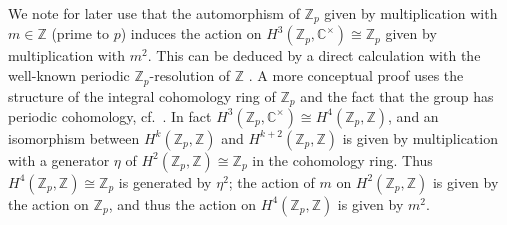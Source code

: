 \documentclass[12pt]{amsart}
\theoremstyle{remark}
\theoremstyle{definition}
\numberwithin{equation}{section}
\newcommand\CC{\mathbb C}
\newcommand\ZZ{\mathbb Z}
\begin{document}
We note for later use that the automorphism of $\ZZ_p$ given by multiplication with $m\in\ZZ$ (prime to $p$) induces the action on $H^3(\ZZ_p,\CC^\times)\cong\ZZ_p$ given by multiplication with $m^2$. This can be deduced by a direct calculation with the well-known periodic $\ZZ_p$-resolution of $\ZZ$ \cite[IV.7]{MR1344215}. A more conceptual proof uses the structure of the integral cohomology ring of $\ZZ_p$ and the fact that the group has periodic cohomology, cf.~\cite{MR0077480,MR672956}. In fact $H^3(\ZZ_p,\CC^\times)\cong H^4(\ZZ_p,\ZZ)$, and an isomorphism between $H^k(\ZZ_p,\ZZ)$ and $H^{k+2}(\ZZ_p,\ZZ)$ is given by multiplication with a generator $\eta$ of $H^2(\ZZ_p,\ZZ)\cong \ZZ_p$ in the cohomology ring. Thus $H^4(\ZZ_p,\ZZ)\cong\ZZ_p$ is generated by $\eta^2$; the action of $m$ on $H^2(\ZZ_p,\ZZ)$ is given by the action on $\ZZ_p$, and thus the action on $H^4(\ZZ_p,\ZZ)$ is given by $m^2$. 
\end{document}
